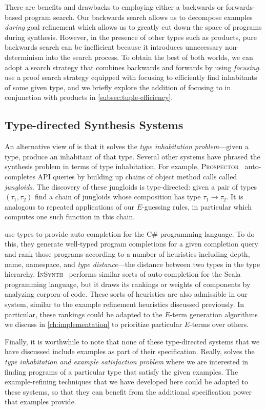 There are benefits and drawbacks to employing either a backwards or forwards-based program search.
Our backwards search allows us to decompose examples \emph{during} goal refinement which allows us to greatly cut down the space of programs during synthesis.
However, in the presence of other types such as products, pure backwards search can be inefficient because it introduces unnecessary non-determinism into the search process.
To obtain the best of both worlds, we can adopt a search strategy that combines backwards and forwards by using \emph{focusing}.
\citet{scherer-icfp-2015} use a proof search strategy equipped with focusing to efficiently find inhabitants of some given type, and we briefly explore the addition of focusing to \lsyn{} in conjunction with products in \autoref{subsec:tuple-efficiency}.

\subsection{Type-directed Synthesis Systems}

An alternative view of \lsyn{} is that it solves the \emph{type inhabitation problem}---given a type, produce an inhabitant of that type.
Several other systems have phrased the synthesis problem in terms of type inhabitation.
For example, \textsc{Prospector}~\citep{mandelin-pldi-2005} auto-completes API queries by building up chains of object method calls called \emph{jungloids}.
The discovery of these jungloids is type-directed: given a pair of types $(τ_1, τ_2)$ find a chain of jungloids whose composition has type $τ_1 → τ_2$.
It is analogous to repeated applications of our $E$-guessing rules, in particular  which computes one such function in this chain.

\citet{perelman-pldi-2012} use types to provide auto-completion for the C\# programming language.
To do this, they generate well-typed program completions for a given completion query and rank those programs according to a number of heuristics including depth, name, namespace, and \emph{type distance}---the distance between two types in the type hierarchy.
\textsc{InSynth}~\citep{gvero-pldi-2013} performs similar sorts of auto-completion for the Scala programming language, but it draws its rankings or weights of components by analyzing corpora of code.
These sorts of heuristics are also admissible in our system, similar to the example refinement heuristics discussed previously.
In particular, these rankings could be adapted to the $E$-term generation algorithms we discuss in \autoref{ch:implementation} to prioritize particular $E$-terms over others.

Finally, it is worthwhile to note that none of these type-directed systems that we have discussed include examples as part of their specification.
Really, \lsyn{} solves the \emph{type inhabitation and example satisfaction problem} where we are interested in finding programs of a particular type that satisfy the given examples.
The example-refining techniques that we have developed here could be adapted to these systems, so that they can benefit from the additional specification power that examples provide.
